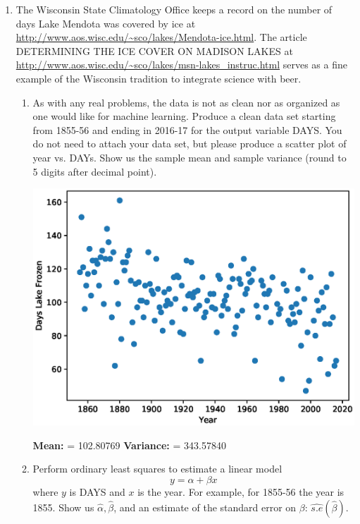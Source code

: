 \documentclass{article}
\begin{document}
\begin{enumerate}


\item 
The Wisconsin State Climatology Office keeps a record on 
the number of days Lake Mendota was covered by ice at
\url{http://www.aos.wisc.edu/~sco/lakes/Mendota-ice.html}.
The article DETERMINING THE ICE COVER ON MADISON LAKES at
\url{http://www.aos.wisc.edu/~sco/lakes/msn-lakes_instruc.html}
serves as a fine example of the Wisconsin tradition to integrate science with beer.

\begin{enumerate}
\item
As with any real problems, the data is not as clean nor as organized as one would like for machine learning.
Produce a clean data set starting from 1855-56 and ending in 2016-17 for the output variable DAYS.
You do not need to attach your data set, but please produce a scatter plot of year vs. DAYs.
Show us the sample mean and sample variance (round to 5 digits after decimal point).

\hspace*{-4cm}  
\includegraphics[scale=1]{ice_scatter}

\color{blue}
\textbf{Mean:} = 102.80769  
\textbf{Variance:} = 343.57840
\color{black}
\item 
Perform ordinary least squares to estimate a linear model 
$$y = \alpha + \beta x$$
where $y$ is DAYS and $x$ is the year.
For example, for 1855-56 the year is 1855.
Show us $\hat{\alpha}, \hat{\beta}$, and an estimate of the standard error on $\beta$: $\widehat{s.e}(\hat{\beta})$.


\end{enumerate}
\end{enumerate}
\end{document}
